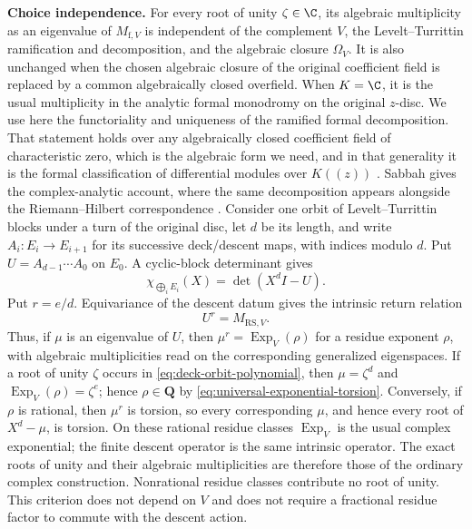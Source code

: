 \noindent\textbf{Choice independence.}
For every root of unity \(\zeta\in\C\), its algebraic multiplicity as an
eigenvalue of \(M_{\mathrm f,V}\) is independent of the complement \(V\), the
Levelt--Turrittin ramification and decomposition, and the algebraic closure
\(\Omega_V\).  It is also unchanged when the chosen algebraic closure of the
original coefficient field is replaced by a common algebraically closed
overfield.  When \(K=\C\), it is the usual multiplicity in the analytic
formal monodromy on the original \(z\)-disc.
We use here the functoriality and uniqueness of the ramified formal
decomposition.  That statement holds over any algebraically closed coefficient
field of characteristic zero, which is the algebraic form we need, and in that
generality it is the formal classification of differential modules over
\(K(\!(z)\!)\) \cite[Chapter~3]{PutSinger}.  Sabbah gives the
complex-analytic account, where the same decomposition appears alongside the
Riemann--Hilbert correspondence
\cite[Lecture~5, Section~5.c, proofs of Theorem~5.8 and
Proposition~5.10]{SabbahStokes}.
Consider one orbit of Levelt--Turrittin blocks under a turn of the original
disc, let \(d\) be its length, and write
\(A_i:E_i\longrightarrow E_{i+1}\) for its successive deck/descent maps,
with indices modulo \(d\).  Put
\(U=A_{d-1}\cdots A_0\) on \(E_0\).  A cyclic-block determinant gives
\[
 \chi_{\bigoplus_iE_i}(X)=\det(X^dI-U).
 \tag{4.0b}
 \label{eq:deck-orbit-polynomial}
\]
Put \(r=e/d\).  Equivariance of the descent datum gives the intrinsic return
relation
\[
 U^r=M_{\mathrm{RS},V}.
 \tag{4.0c}
 \label{eq:deck-return-power}
\]
Thus, if \(\mu\) is an eigenvalue of \(U\), then
\(\mu^r=\operatorname{Exp}_V(\rho)\) for a residue exponent \(\rho\), with
algebraic multiplicities read on the corresponding generalized eigenspaces.
If a root of unity \(\zeta\) occurs in
\eqref{eq:deck-orbit-polynomial}, then \(\mu=\zeta^d\) and
\(\operatorname{Exp}_V(\rho)=\zeta^e\); hence \(\rho\in\mathbf Q\) by
\eqref{eq:universal-exponential-torsion}.  Conversely, if \(\rho\) is
rational, then \(\mu^r\) is torsion, so every corresponding \(\mu\), and
hence every root of \(X^d-\mu\), is torsion.  On these rational residue
classes \(\operatorname{Exp}_V\) is the usual complex exponential; the
finite descent operator is the same intrinsic operator.  The exact roots of
unity and their algebraic multiplicities are therefore those of the ordinary
complex construction.  Nonrational residue classes contribute no root of
unity.  This criterion does not depend on \(V\) and does not require a
fractional residue factor to commute with the descent action.

